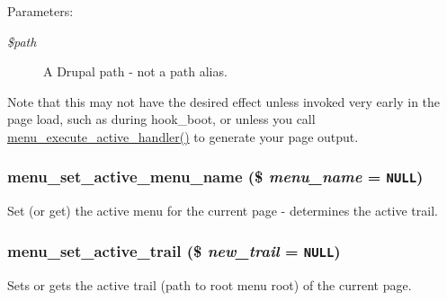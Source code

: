\begin{Desc}
\item[Parameters:]
\begin{description}
\item[{\em \$path}]A Drupal path - not a path alias.\end{description}
\end{Desc}
Note that this may not have the desired effect unless invoked very early in the page load, such as during hook\_\-boot, or unless you call \hyperlink{group__menu_gc2cef001e8197fecd49924e6e0e251c6}{menu\_\-execute\_\-active\_\-handler()} to generate your page output. \hypertarget{group__menu_g017400eafe570a87460d4e6a4a305407}{
\subsubsection[{menu\_\-set\_\-active\_\-menu\_\-name}]{\setlength{\rightskip}{0pt plus 5cm}menu\_\-set\_\-active\_\-menu\_\-name (\$ {\em menu\_\-name} = {\tt NULL})}}
\label{group__menu_g017400eafe570a87460d4e6a4a305407}


Set (or get) the active menu for the current page - determines the active trail. \hypertarget{group__menu_g9328a9a4f297d8bb095d924e75a8abd7}{
\subsubsection[{menu\_\-set\_\-active\_\-trail}]{\setlength{\rightskip}{0pt plus 5cm}menu\_\-set\_\-active\_\-trail (\$ {\em new\_\-trail} = {\tt NULL})}}
\label{group__menu_g9328a9a4f297d8bb095d924e75a8abd7}


Sets or gets the active trail (path to root menu root) of the current page.

